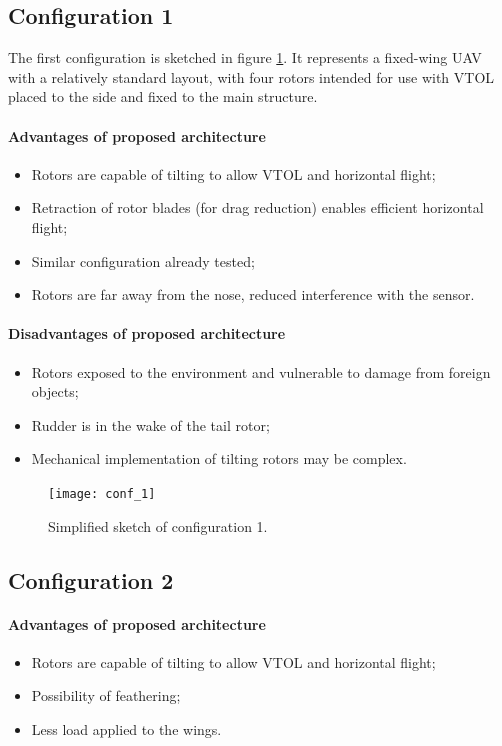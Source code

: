 \documentclass[english,fira]{ist-report}
\begin{document}
\subsection{Configuration 1}

The first configuration is sketched in figure \ref{fig:conf_1}. It represents a fixed-wing UAV with a relatively standard layout, with four rotors intended for use with VTOL placed to the side and fixed to the main structure.

\paragraph{Advantages of proposed architecture}
\begin{itemize}
	\item Rotors are capable of tilting to allow VTOL and horizontal flight; 
	\item Retraction of rotor blades (for drag reduction) enables efficient horizontal flight;
	\item Similar configuration already tested;
	\item Rotors are far away from the nose, reduced interference with the sensor.
\end{itemize} 

\paragraph{Disadvantages of proposed architecture}
\begin{itemize}
	\item Rotors exposed to the environment and vulnerable to damage from foreign objects;
	\item Rudder is in the wake of the tail rotor;
	\item Mechanical implementation of tilting rotors may be complex.
\end{itemize}

\begin{figure}[ht]
	\centering
	\texttt{[image: conf\_1]}
	\caption{Simplified sketch of configuration 1.}
	\label{fig:conf_1}
\end{figure}

\subsection{Configuration 2} 

\paragraph{Advantages of proposed architecture}
\begin{itemize}
	\item Rotors are capable of tilting to allow VTOL and horizontal flight; 
	\item Possibility of feathering;
	\item Less load applied to the wings.
\end{itemize}
\end{document}
